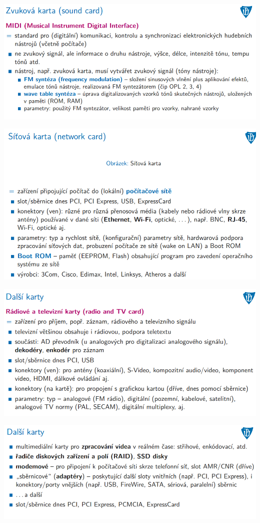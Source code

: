 \documentclass[10pt,a4paper]{article}
\begin{document}
\includegraphics[scale=0.65]{img/prvni_odstavec/otazka7/karty10.png}

\includegraphics[scale=0.65]{img/prvni_odstavec/otazka7/karty11.png}

\includegraphics[scale=0.65]{img/prvni_odstavec/otazka7/karty12.png}

\includegraphics[scale=0.65]{img/prvni_odstavec/otazka7/karty13.png}
\end{document}
